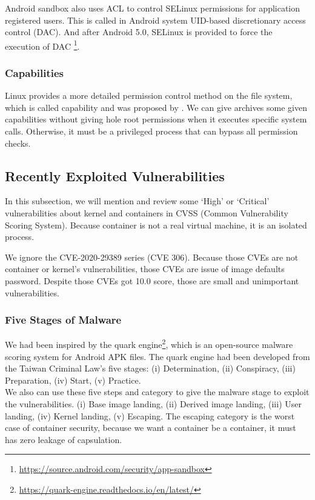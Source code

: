 Android sandbox also uses ACL to control SELinux permissions for application registered users.
This is called in Android system UID-based discretionary access control (DAC).
And after Android 5.0, SELinux is provided to force the execution of DAC
\footnote{\url{https://source.android.com/security/app-sandbox}}.

\subsubsection{Capabilities}
\label{Capabilities}
Linux provides a more detailed permission control method on the file system, which is called
capability and was proposed by \citeauthor{6234805}. We can give archives some given capabilities
without giving hole root permissions when it executes specific system calls. Otherwise, it
must be a privileged process that can bypass all permission checks.

\subsection{Recently Exploited Vulnerabilities}
In this subsection, we will mention and review some `High' or `Critical' vulnerabilities
about kernel and containers in CVSS (Common Vulnerability Scoring System).
Because container is not a real virtual machine, it is an isolated process.

We ignore the CVE-2020-29389 series (CVE 306). Because those CVEs are not container or kernel's
vulnerabilities, those CVEs are issue of image defaults password. Despite those CVEs got 10.0 score,
those are small and unimportant vulnerabilities.

\subsubsection{Five Stages of Malware}
\label{Five_stage_of_malware}
We had been inspired by the quark engine\footnote{\url{https://quark-engine.readthedocs.io/en/latest/}},
which is an open-source malware scoring system for Android APK files. The quark
engine had been developed from the Taiwan Criminal Law's five stages:
(\Rn{1}) Determination, (\Rn{2}) Conspiracy, (\Rn{3}) Preparation, (\Rn{4}) Start, (\Rn{5}) Practice.\\

We also can use these five steps and category to give the malware stage to exploit the vulnerabilities.
(\Rn{1}) Base image landing, (\Rn{2}) Derived image landing, (\Rn{3}) User landing, (\Rn{4}) Kernel landing,
(\Rn{5}) Escaping. The escaping category is the worst case of container security, because we want a
container be a container, it must has zero leakage of capsulation.

